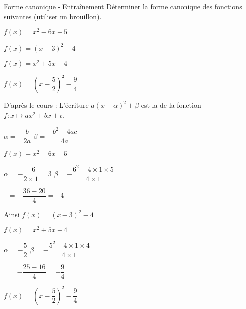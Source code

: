 \begin{EXO}{Forme canonique - Entraînement}{}
 Déterminer la forme canonique des fonctions suivantes (utiliser un brouillon). 
\begin{tcbenumerate}[2]
\tcbitem $f(x) = x^2-6x+5$
\begin{crep}
$f(x) = ( x - 3 )^2 - 4$
\end{crep}
\tcbitem $f(x) = x^2+5x+4$
\begin{crep}
$f(x) = ( x - \dfrac{5}{2} )^2 - \dfrac{9}{4}$ 
\end{crep}
\end{tcbenumerate}

\exocorrection

D'après le cours : 
L'écriture $a(x-\alpha)^{2} +\beta$ est la de la fonction $f:x\mapsto ax^{2} + bx + c$.
    
    \begin{tcbenumerate}[1]
        \tcbitem[halign=center] $\alpha = -\dfrac{b}{2a}$
        \tcbitem[halign=center] $\beta = -\dfrac{b^2-4ac}{4a}$
    \end{tcbenumerate}
    \begin{tcbenumerate}[2]
\tcbitem[boxrule=0.4pt,colframe=black,halign=left] $f(x) = x^2-6x+5$
\begin{tcbenumerate}[2][1][alph]
        \tcbitem[halign=center] $\alpha = -\dfrac{-6}{2\times 1} = 3$
        \tcbitem[halign=center] $\beta = -\dfrac{6^2-4\times 1 \times 5}{4\times 1}$
        
        $\phantom{\beta}= -\dfrac{36-20}{4} = -4$
    \end{tcbenumerate}
Ainsi $f(x) = ( x - 3 )^2 - 4$

\tcbitem[boxrule=0.4pt,colframe=black,halign=left] $f(x) = x^2+5x+4$
    \begin{tcbenumerate}[2][1][alph]
        \tcbitem[halign=center] $\alpha = -\dfrac{5}{2}$
        \tcbitem[halign=center] $\beta = -\dfrac{5^2-4\times 1 \times 4}{4\times 1}$
        
        $\phantom{\beta}= -\dfrac{25-16}{4} = -\dfrac{9}{4}$
    \end{tcbenumerate}
$f(x) = ( x - \dfrac{5}{2} )^2 - \dfrac{9}{4}$ 

\end{tcbenumerate}
\end{EXO}